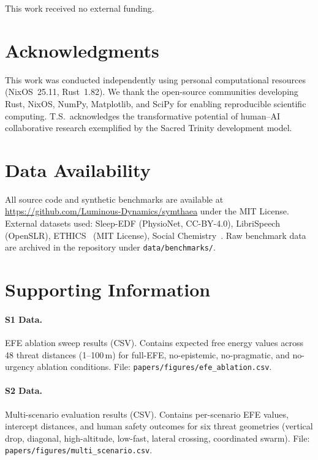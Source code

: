 \documentclass[10pt,letterpaper]{article}
\begin{document}
This work received no external funding.

\section*{Acknowledgments}

This work was conducted independently using personal computational resources
(NixOS~25.11, Rust~1.82). We thank the open-source communities developing
Rust, NixOS, NumPy, Matplotlib, and SciPy for enabling reproducible scientific
computing. T.S.\ acknowledges the transformative potential of human--AI
collaborative research exemplified by the Sacred Trinity development model.

\section*{Data Availability}

All source code and synthetic benchmarks are available at
\url{https://github.com/Luminous-Dynamics/symthaea} under the MIT License.
External datasets used: Sleep-EDF (PhysioNet, CC-BY-4.0), LibriSpeech
(OpenSLR), ETHICS~\cite{hendrycks2021aligning} (MIT License), Social
Chemistry~\cite{forbes2020social}. Raw benchmark data are archived in the
repository under \texttt{data/benchmarks/}.

\section*{Supporting Information}

\paragraph*{S1 Data.}
\label{s1-data}
{EFE ablation sweep results (CSV). Contains expected free energy values across
48 threat distances (1--100\,m) for full-EFE, no-epistemic, no-pragmatic, and
no-urgency ablation conditions. File:
\texttt{papers/figures/efe\_ablation.csv}.}

\paragraph*{S2 Data.}
\label{s2-data}
{Multi-scenario evaluation results (CSV). Contains per-scenario EFE values,
intercept distances, and human safety outcomes for six threat geometries
(vertical drop, diagonal, high-altitude, low-fast, lateral crossing,
coordinated swarm). File: \texttt{papers/figures/multi\_scenario.csv}.}
\end{document}
